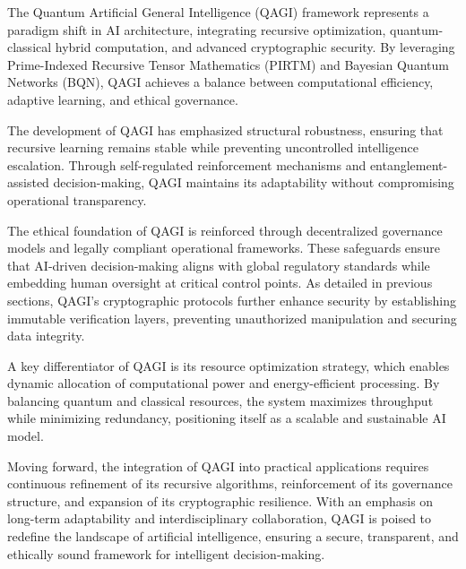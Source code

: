 \documentclass{article}
\theoremstyle{plain}
\theoremstyle{claimstyle}
\begin{document}
The Quantum Artificial General Intelligence (QAGI) framework represents a paradigm shift in AI architecture, integrating recursive optimization, quantum-classical hybrid computation, and advanced cryptographic security. By leveraging Prime-Indexed Recursive Tensor Mathematics (PIRTM) and Bayesian Quantum Networks (BQN), QAGI achieves a balance between computational efficiency, adaptive learning, and ethical governance.

The development of QAGI has emphasized structural robustness, ensuring that recursive learning remains stable while preventing uncontrolled intelligence escalation. Through self-regulated reinforcement mechanisms and entanglement-assisted decision-making, QAGI maintains its adaptability without compromising operational transparency.

The ethical foundation of QAGI is reinforced through decentralized governance models and legally compliant operational frameworks. These safeguards ensure that AI-driven decision-making aligns with global regulatory standards while embedding human oversight at critical control points. As detailed in previous sections, QAGI’s cryptographic protocols further enhance security by establishing immutable verification layers, preventing unauthorized manipulation and securing data integrity.

A key differentiator of QAGI is its resource optimization strategy, which enables dynamic allocation of computational power and energy-efficient processing. By balancing quantum and classical resources, the system maximizes throughput while minimizing redundancy, positioning itself as a scalable and sustainable AI model.

Moving forward, the integration of QAGI into practical applications requires continuous refinement of its recursive algorithms, reinforcement of its governance structure, and expansion of its cryptographic resilience. With an emphasis on long-term adaptability and interdisciplinary collaboration, QAGI is poised to redefine the landscape of artificial intelligence, ensuring a secure, transparent, and ethically sound framework for intelligent decision-making.


\nolinenumbers
\nocite{*}


\end{document}
